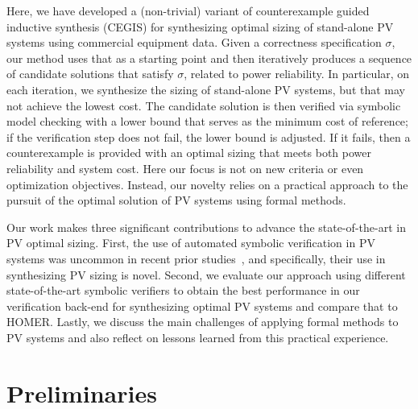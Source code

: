 \documentclass[runningheads]{llncs}
\begin{document}
Here, we have developed a (non-trivial) variant of counterexample guided inductive synthesis (CEGIS) for synthesizing optimal sizing of stand-alone PV systems using commercial equipment data. Given a correctness specification $\sigma$, our method uses that as a starting point and then iteratively produces a sequence of candidate solutions that satisfy $\sigma$, related to power reliability. In particular, on each iteration, we synthesize the sizing of stand-alone PV systems, but that may not achieve the lowest cost. The candidate solution is then verified via symbolic model checking with a lower bound that serves as the minimum cost of reference; if the verification step does not fail, the lower bound is adjusted. If it fails, then a counterexample is provided with an optimal sizing that meets both power reliability and system cost. Here our focus is not on new criteria or even optimization objectives. Instead, our novelty relies on a practical approach to the pursuit of the optimal solution of PV systems using formal methods. 

Our work makes three significant contributions to advance the state-of-the-art in PV optimal sizing. First, the use of automated symbolic verification in PV systems was uncommon in recent prior studies~\cite{TrindadeCordeiro19}, and specifically, their use in synthesizing PV sizing is novel. Second, we evaluate our approach using different state-of-the-art symbolic verifiers to obtain the best performance in our verification back-end for synthesizing optimal PV systems and compare that to HOMER. Lastly, we discuss the main challenges of applying formal methods to PV systems and also reflect on lessons learned from this practical experience.

\section{Preliminaries}
\label{sec:AutomatedVerification}
\end{document}
